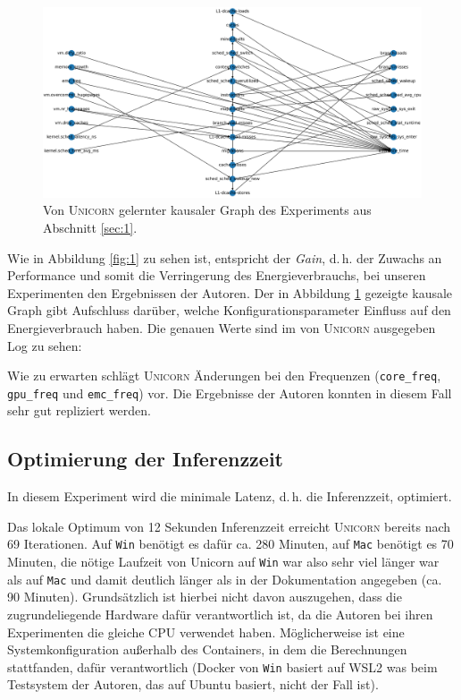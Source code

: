 \documentclass[11pt]{article}
\begin{document}
\begin{figure}[tp!]
  \centering
  \includegraphics[width=\linewidth]{./img/causal_graph.png}
  \caption{Von \textsc{Unicorn} gelernter kausaler Graph des Experiments aus Abschnitt \ref{sec:1}.}

  \label{fig:2}
\end{figure}

Wie in Abbildung \ref{fig:1} zu sehen ist, entspricht der \textit{Gain}, d.\,h. der Zuwachs an Performance und somit die Verringerung des Energieverbrauchs, bei unseren Experimenten den Ergebnissen der Autoren. Der in Abbildung \ref{fig:2} gezeigte kausale Graph gibt Aufschluss darüber, welche Konfigurationsparameter Einfluss auf den Energieverbrauch haben. Die genauen Werte sind im von \textsc{Unicorn} ausgegeben Log zu sehen:

Wie zu erwarten schlägt \textsc{Unicorn} Änderungen bei den Frequenzen (\texttt{core\_freq}, \texttt{gpu\_freq} und \texttt{emc\_freq}) vor. Die Ergebnisse der Autoren konnten in diesem Fall sehr gut repliziert werden.

\subsection{Optimierung der Inferenzzeit}

In diesem Experiment wird die minimale Latenz, d.\,h. die Inferenzzeit, optimiert.

Das lokale Optimum von 12 Sekunden Inferenzzeit erreicht \textsc{Unicorn} bereits nach 69 Iterationen. Auf \texttt{Win} benötigt es dafür ca. 280 Minuten, auf \texttt{Mac} benötigt es 70 Minuten, die nötige Laufzeit von Unicorn auf \texttt{Win} war also sehr viel länger war als auf \texttt{Mac} und damit deutlich länger als in der Dokumentation angegeben (ca. 90 Minuten). Grundsätzlich ist hierbei nicht davon auszugehen, dass die zugrundeliegende Hardware dafür verantwortlich ist, da die Autoren bei ihren Experimenten die gleiche CPU verwendet haben. Möglicherweise ist eine Systemkonfiguration außerhalb des Containers, in dem die Berechnungen stattfanden, dafür verantwortlich (Docker von \texttt{Win} basiert auf WSL2 was beim Testsystem der Autoren, das auf Ubuntu basiert, nicht der Fall ist).
\end{document}
